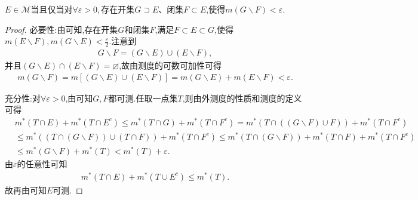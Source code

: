 \documentclass[../../main.tex]{subfiles}
\begin{document}
\begin{corollary}\label{corollary:集合可测的充要条件2}
$E\in \mathscr{M}$当且仅当对$\forall \varepsilon>0,$存在开集$G\supset E$、闭集$F\subset E$,使得$m(G\backslash F)<\varepsilon.$
\end{corollary}
\begin{proof}
{\heiti 必要性:}由可知,存在开集$G$和闭集$F$,满足$F\subset E\subset G$,使得$m(E\backslash F),m(G\backslash E)<\frac{\varepsilon}{2}$.注意到
\begin{align*}
G\backslash F=(G\backslash E)\cup (E\backslash F),
\end{align*}
并且$(G\backslash E)\cap (E\backslash F)=\varnothing$,故由测度的可数可加性可得
\begin{align*}
m(G\backslash F)=m[(G\backslash E)\cup (E\backslash F)]=m(G\backslash E)+m(E\backslash F)<\varepsilon.
\end{align*}

{\heiti 充分性:}对$\forall \varepsilon>0$,由可知$G,F$都可测.任取一点集$T$,则由外测度的性质和测度的定义可得
\begin{align*}
&m^*\left( T\cap E \right) +m^*\left( T\cap E^c \right) \leqslant m^*\left( T\cap G \right) +m^*\left( T\cap F^c \right) =m^*(T\cap \left( \left( G\backslash F \right) \cup F \right) )+m^*\left( T\cap F^c \right) 
\\
&\leqslant m^*\left( \left( T\cap \left( G\backslash F \right) \right) \cup \left( T\cap F \right) \right) +m^*\left( T\cap F^c \right) \leqslant m^*\left( T\cap \left( G\backslash F \right) \right) +m^*\left( T\cap F \right) +m^*\left( T\cap F^c \right) 
\\
&\leqslant m^*\left( G\backslash F \right) +m^*\left( T \right) <m^*\left( T \right) +\varepsilon .
\end{align*}
由$\varepsilon$的任意性可知
\begin{align*}
m^*\left( T\cap E \right) +m^*\left( T\cup E^c \right) \leqslant m^*(T).
\end{align*}
故再由可知$E$可测.

\end{proof}
\end{document}
